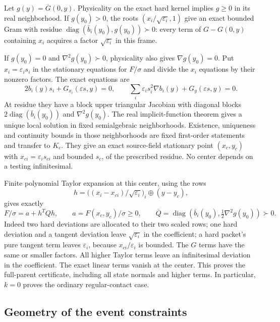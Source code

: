 Let $g(y)=\overline G(0,y)$. Physicality on the exact hard kernel
implies $g\ge0$ in its real neighborhood. If $g(y_0)>0$, the roots
$(x_i/\sqrt{\varepsilon_i},1)$ give an exact bounded Gram with residue
$\operatorname{diag}(\bar b_i(y_0),g(y_0))\succ0$:
every term of $G-G(0,y)$ containing $x_i$ acquires a factor
$\sqrt{\varepsilon_i}$ in this frame.

If $g(y_0)=0$ and $\nabla^2g(y_0)\succ0$, physicality also gives
$\nabla g(y_0)=0$. Put $x_i=\varepsilon_i s_i$ in the stationary
equations for $F/\sigma$ and divide the $x_i$ equations by their
nonzero factors. The exact equations are
\[
 2b_i(y)s_i+G_{x_i}(\varepsilon s,y)=0,\qquad
 \sum_i\varepsilon_i s_i^2\nabla b_i(y)
                       +G_y(\varepsilon s,y)=0.       \tag{NC8}
\]
At residue they have a block upper triangular Jacobian with diagonal
blocks $2\operatorname{diag}(\bar b_i(y_0))$ and
$\nabla^2g(y_0)$. The real implicit-function theorem gives a unique
local solution in fixed semialgebraic neighborhoods. Existence,
uniqueness and continuity bounds in those neighborhoods are fixed
first-order statements and transfer to $K_c$. They give an exact
source-field stationary point $(x_c,y_c)$ with
$x_{ci}=\varepsilon_i s_{ci}$ and bounded $s_c$, of the prescribed
residue. No center depends on a testing infinitesimal.

Finite polynomial Taylor expansion at this center, using the rows
\[
 h=\big((x_i-x_{ci})/\sqrt{\varepsilon_i}\big)_i
                    \mathbin{\oplus}(y-y_c),
\]
gives exactly
\[
 F/\sigma=a+h^TQh,\qquad
 a=F(x_c,y_c)/\sigma\ge0,\qquad
 \bar Q=\operatorname{diag}
   (\bar b_i(y_0),\tfrac12\nabla^2g(y_0))\succ0.      \tag{NC9}
\]
Indeed two hard deviations are allocated to their two scaled rows;
one hard deviation and a tangent deviation leave
$\sqrt{\varepsilon_i}$ in the coefficient; a hard packet's pure
tangent term leaves $\varepsilon_i$, because
$x_{ci}/\varepsilon_i$ is bounded. The $G$ terms have the same or
smaller factors. All higher Taylor terms leave an infinitesimal
deviation in the coefficient. The exact linear terms vanish at the
center. This proves the full-parent certificate, including all state
normals and higher terms. In particular, $k=0$ proves the ordinary
regular-contact case.

\subsection{Geometry of the event constraints}

